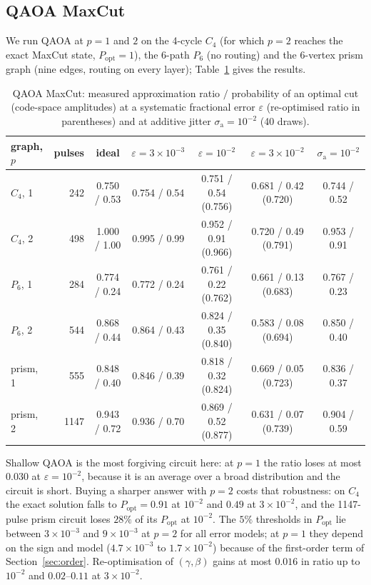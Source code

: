 \documentclass[reprint,aps,pra,amsmath,amssymb,superscriptaddress,letterpaper]{revtex4-2}
\newcommand{\Popt}{P_{\mathrm{opt}}}
\begin{document}
\subsection{QAOA MaxCut}
\label{sec:qaoa}

We run QAOA at $p=1$ and $2$ on the 4-cycle $C_4$ (for which $p=2$ reaches the
exact MaxCut state, $\Popt=1$), the 6-path $P_6$ (no routing) and the 6-vertex
prism graph (nine edges, routing on every layer); Table~\ref{tab:qaoa} gives the results.

\begin{table}[t]
\centering\small
\caption{QAOA MaxCut: measured approximation ratio $/$ probability of an
optimal cut (code-space amplitudes) at a systematic fractional error
$\varepsilon$ (re-optimised ratio in parentheses) and at additive jitter
$\sigma_{\mathrm a}=10^{-2}$ (40 draws).}
\label{tab:qaoa}
\setlength{\tabcolsep}{4pt}
\begin{tabular}{lrccccc}
\toprule
graph, $p$ & pulses & ideal & $\varepsilon=3\times10^{-3}$ & $\varepsilon=10^{-2}$ & $\varepsilon=3\times10^{-2}$ & $\sigma_{\mathrm a}=10^{-2}$\\
\midrule
$C_4$, 1 & 242 & 0.750 / 0.53 & 0.754 / 0.54 & 0.751 / 0.54 (0.756) & 0.681 / 0.42 (0.720) & 0.744 / 0.52\\
$C_4$, 2 & 498 & 1.000 / 1.00 & 0.995 / 0.99 & 0.952 / 0.91 (0.966) & 0.720 / 0.49 (0.791) & 0.953 / 0.91\\
$P_6$, 1 & 284 & 0.774 / 0.24 & 0.772 / 0.24 & 0.761 / 0.22 (0.762) & 0.661 / 0.13 (0.683) & 0.767 / 0.23\\
$P_6$, 2 & 544 & 0.868 / 0.44 & 0.864 / 0.43 & 0.824 / 0.35 (0.840) & 0.583 / 0.08 (0.694) & 0.850 / 0.40\\
prism, 1 & 555 & 0.848 / 0.40 & 0.846 / 0.39 & 0.818 / 0.32 (0.824) & 0.669 / 0.05 (0.723) & 0.836 / 0.37\\
prism, 2 & 1147 & 0.943 / 0.72 & 0.936 / 0.70 & 0.869 / 0.52 (0.877) & 0.631 / 0.07 (0.739) & 0.904 / 0.59\\
\bottomrule
\end{tabular}
\end{table}

Shallow QAOA is the most forgiving circuit here: at $p=1$ the ratio loses at
most $0.030$ at $\varepsilon=10^{-2}$, because it is an average over a broad
distribution and the circuit is short. Buying a sharper answer with $p=2$
costs that robustness: on $C_4$ the exact solution falls to $\Popt=0.91$ at
$10^{-2}$ and $0.49$ at $3\times10^{-2}$, and the 1147-pulse prism circuit
loses $28\%$ of its $\Popt$ at $10^{-2}$. The $5\%$ thresholds in $\Popt$ lie
between $3\times10^{-3}$ and $9\times10^{-3}$ at $p=2$ for all error models; at
$p=1$ they depend on the sign and model ($4.7\times10^{-3}$ to
$1.7\times10^{-2}$) because of the first-order term of
Section~\ref{sec:order}. Re-optimisation of $(\gamma,\beta)$ gains at most
$0.016$ in ratio up to $10^{-2}$ and $0.02$--$0.11$ at $3\times10^{-2}$.
\end{document}
